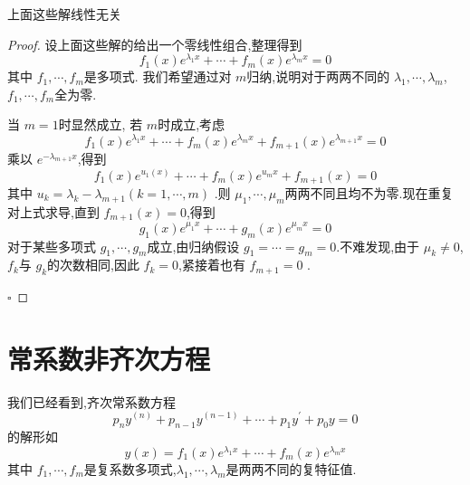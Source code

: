 \documentclass[lang=cn,12pt,color=green,fontset=none]{elegantbook}
\begin{document}
\begin{proposition}
    上面这些解线性无关
\end{proposition}

\begin{proof}
    设上面这些解的给出一个零线性组合,整理得到 \[
    f_1\left( x \right)e^{\lambda_1x}+ \cdots + f_{m}\left( x \right)e^{\lambda_{m}x}=0  
    \]其中 \(   f_1,\cdots,f_m   \)是多项式.
    我们希望通过对 \(  m  \)归纳,说明对于两两不同的 \(   \lambda_1,\cdots,\lambda_m   \), \(   f_1,\cdots,f_m   \)全为零.

    当 \(   m=1  \)时显然成立, 若 \(  m  \)时成立,考虑 \[
    f_1\left( x \right)e^{\lambda_1x}+ \cdots + f_{m}\left( x \right)e^{\lambda_{m}x}+ f_{m+ 1}\left( x \right)e^{\lambda_{m+ 1}x}=0   
    \] 乘以 \(  e^{-\lambda_{m+ 1}x}  \),得到 \[
    f_1\left( x \right)e^{u_1\left( x \right) }+ \cdots + f_{m}\left( x \right)e^{u_{m}x}+ f_{m+ 1}\left( x \right)=0   
    \] 其中 \(  u_{k}= \lambda_{k}-\lambda_{m+ 1}  \)\(  \left( k= 1,\cdots,m  \right)   \)  .则 \(   \mu_1,\cdots,\mu_m   \)两两不同且均不为零.现在重复对上式求导,直到 \(  f_{m+ 1}\left( x \right)=0   \),得到 \[
    g_1\left( x \right)e^{\mu_1x}+ \cdots + g_{m}\left( x \right)e^{\mu_{m}x}=0  
    \]  对于某些多项式 \(   g_1,\cdots,g_m   \)成立,由归纳假设 \(  g_1=\cdots =g_{m}=0  \).不难发现,由于 \(  \mu_{k} \neq 0  \),\(  f_{k}  \)与 \(  g_{k}  \)的次数相同,因此 \(  f_{k}=0  \),紧接着也有 \(  f_{m+ 1}=0  \)       .

    \hfill $\square$
\end{proof}


\section{常系数非齐次方程}

我们已经看到,齐次常系数方程 \[
p_{n}y^{\left( n \right) }+ p_{n-1}y^{\left( n-1 \right) }+ \cdots + p_1y^{\prime} + p_0y=0
\]
的解形如 \[
y\left( x \right)=f_1\left( x \right)e^{\lambda_1x}+ \cdots + f_{m}\left( x \right)e^{\lambda_{m}x}   
\]其中 \(   f_1,\cdots,f_m   \)是复系数多项式,\(   \lambda_1,\cdots,\lambda_m   \)是两两不同的复特征值.
\end{document}
